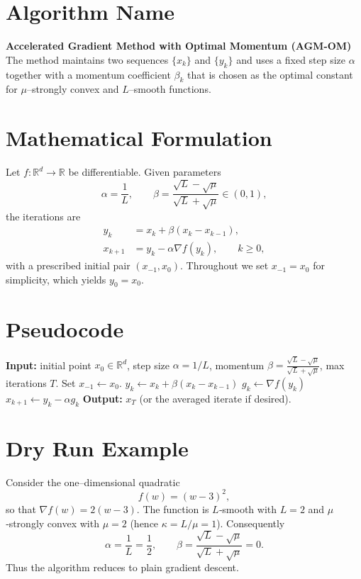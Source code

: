 \documentclass{article}
\begin{document}
\section*{Algorithm Name}
\textbf{Accelerated Gradient Method with Optimal Momentum (AGM-OM)}\\
The method maintains two sequences $\{x_k\}$ and $\{y_k\}$ and uses a fixed
step size $\alpha$ together with a momentum coefficient $\beta_k$ that is
chosen as the optimal constant for $\mu$–strongly convex and $L$–smooth
functions.

\section*{Mathematical Formulation}
Let $f:\mathbb{R}^d\rightarrow\mathbb{R}$ be differentiable.  
Given parameters
\[
\alpha = \frac{1}{L},\qquad 
\beta = \frac{\sqrt{L}-\sqrt{\mu}}{\sqrt{L}+\sqrt{\mu}}\in(0,1),
\]
the iterations are
\begin{align}
y_k &= x_k + \beta (x_k-x_{k-1}), \label{eq:y}\\
x_{k+1} &= y_k - \alpha \nabla f(y_k), \qquad k\ge 0,
\end{align}
with a prescribed initial pair $(x_{-1},x_0)$.  Throughout we set
$x_{-1}=x_0$ for simplicity, which yields $y_0=x_0$.

\section*{Pseudocode}
\begin{algorithm}[H]
\caption{Accelerated Gradient Method with Optimal Momentum}
\begin{algorithmic}[1]
\State \textbf{Input:} initial point $x_0\in\mathbb{R}^d$, step size $\alpha=1/L$, momentum $\beta=\frac{\sqrt{L}-\sqrt{\mu}}{\sqrt{L}+\sqrt{\mu}}$, max iterations $T$.
\State Set $x_{-1}\gets x_0$.
    \State $y_k \gets x_k + \beta (x_k - x_{k-1})$ \hfill{}
    \State $g_k \gets \nabla f(y_k)$ \hfill{}
    \State $x_{k+1} \gets y_k - \alpha g_k$ \hfill{}
\EndFor
\State \textbf{Output:} $x_T$ (or the averaged iterate if desired).
\end{algorithmic}
\end{algorithm}

\section*{Dry Run Example}
Consider the one–dimensional quadratic
\[
f(w) = (w-3)^2,
\]
so that $\nabla f(w)=2(w-3)$.  The function is $L$‑smooth with $L=2$ and
$\mu$‑strongly convex with $\mu=2$ (hence $\kappa=L/\mu=1$).  Consequently
\[
\alpha=\frac1L=\frac12,\qquad 
\beta=\frac{\sqrt{L}-\sqrt{\mu}}{\sqrt{L}+\sqrt{\mu}}=0.
\]
Thus the algorithm reduces to plain gradient descent.
\end{document}
